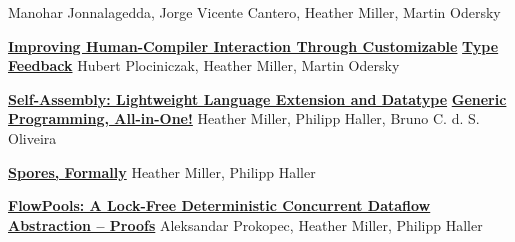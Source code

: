 \documentclass[9pt]{article}
\begin{document}
\newline\noindent Manohar Jonnalagedda, Jorge Vicente Cantero, Heather Miller, Martin Odersky
\medskip

\noindent\href{https://infoscience.epfl.ch/record/197948}{\bf Improving Human-Compiler Interaction Through Customizable} \vspace{-0.03in}
\newline\noindent\href{https://infoscience.epfl.ch/record/197948}{\bf Type Feedback}\dates{}
\newline\noindent Hubert Plociniczak, Heather Miller, Martin Odersky
\medskip

\noindent\href{https://infoscience.epfl.ch/record/199389}{\bf Self-Assembly: Lightweight Language Extension and Datatype}\vspace{-0.03in}
\newline\noindent\href{https://infoscience.epfl.ch/record/199389}{\bf Generic Programming, All-in-One!}\dates{}
\newline\noindent Heather Miller, Philipp Haller, Bruno C. d. S. Oliveira
\medskip

\noindent\href{http://infoscience.epfl.ch/record/191240}{\bf Spores, Formally}
\newline\noindent Heather Miller, Philipp Haller
\medskip

\noindent\href{http://infoscience.epfl.ch/record/181098}{\bf  FlowPools: A Lock-Free Deterministic Concurrent Dataflow}\vspace{-0.03in}
\newline\noindent\href{http://infoscience.epfl.ch/record/181098}{\bf  Abstraction -- Proofs}\dates{}
\newline\noindent Aleksandar Prokopec, Heather Miller, Philipp Haller


\bigskip
{}

\end{document}
